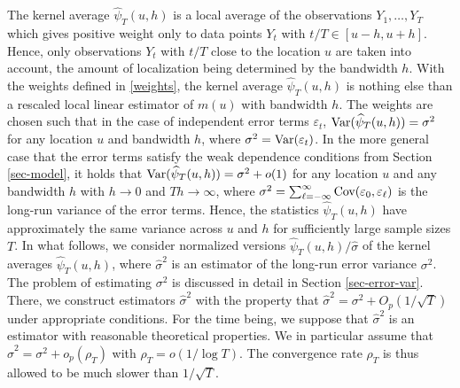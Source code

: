 The kernel average $\widehat{\psi}_T(u,h)$ is a local average of the observations $Y_1,\ldots,Y_T$ which gives positive weight only to data points $Y_t$ with $t/T \in [u-h,u+h]$. Hence, only observations $Y_t$ with $t/T$ close to the location $u$ are taken into account, the amount of localization being determined by the bandwidth $h$. With the weights defined in \eqref{weights}, the kernel average $\widehat{\psi}_T(u,h)$ is nothing else than a rescaled local linear estimator of $m(u)$ with bandwidth $h$. The weights are chosen such that in the case of independent error terms $\varepsilon_t$, $\textnormal{Var}(\widehat{\psi}_T(u,h)) = \sigma^2$ for any location $u$ and bandwidth $h$, where $\sigma^2 = \textnormal{Var}(\varepsilon_t)$. In the more general case that the error terms satisfy the weak dependence conditions from Section \ref{sec-model}, it holds that $\textnormal{Var}(\widehat{\psi}_T(u,h)) = \sigma^2 + o(1)$ for any location $u$ and any bandwidth $h$ with $h \rightarrow 0$ and $Th \rightarrow \infty$, where $\sigma^2 = \sum\nolimits_{\ell=-\infty}^{\infty} \textnormal{Cov}(\varepsilon_0, \varepsilon_{\ell})$ is the long-run variance of the error terms. Hence, the statistics $\widehat{\psi}_T(u,h)$ have approximately the same variance across $u$ and $h$ for sufficiently large sample sizes $T$. In what follows, we consider normalized versions $\widehat{\psi}_T(u,h)/\widehat{\sigma}$ of the kernel averages $\widehat{\psi}_T(u,h)$, where $\widehat{\sigma}^2$ is an estimator of the long-run error variance $\sigma^2$. The problem of estimating $\sigma^2$ is discussed in detail in Section \ref{sec-error-var}. There, we construct estimators $\widehat{\sigma}^2$ with the property that $\widehat{\sigma}^2 = \sigma^2 + O_p(1/\sqrt{T})$ under appropriate conditions. For the time being, we suppose that $\widehat{\sigma}^2$ is an estimator with reasonable theoretical properties. We in particular assume that $\widehat{\sigma}^2 = \sigma^2 + o_p(\rho_T)$ with $\rho_T = o(1/\log T)$. The convergence rate $\rho_T$ is thus allowed to be much slower than $1/\sqrt{T}$. 


